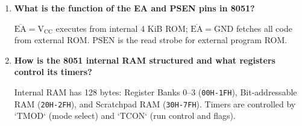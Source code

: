 \documentclass[12pt,a4paper]{article}
\newcommand{\Q}[1]{\textbf{#1}\par\noindent\ignorespaces}
\begin{document}
\begin{tcolorbox}[exambox, title={Frequently Asked / Viva Questions}]
\begin{enumerate}[leftmargin=*, label=\textbf{Q\arabic*.}, itemsep=2.5pt]
  \item \Q{What is the function of the EA and PSEN pins in 8051?}
  $\overline{\mathrm{EA}}=\mathrm{V_{CC}}$ executes from internal 4 KiB ROM; $\overline{\mathrm{EA}}=\mathrm{GND}$ fetches all code from external ROM. $\overline{\mathrm{PSEN}}$ is the read strobe for external program ROM.
  \item \Q{How is the 8051 internal RAM structured and what registers control its timers?}
  Internal RAM has 128 bytes: Register Banks 0--3 (\texttt{00H-1FH}), Bit-addressable RAM (\texttt{20H-2FH}), and Scratchpad RAM (\texttt{30H-7FH}). Timers are controlled by `TMOD` (mode select) and `TCON` (run control and flags).
\end{enumerate}
\end{tcolorbox}
\end{document}

